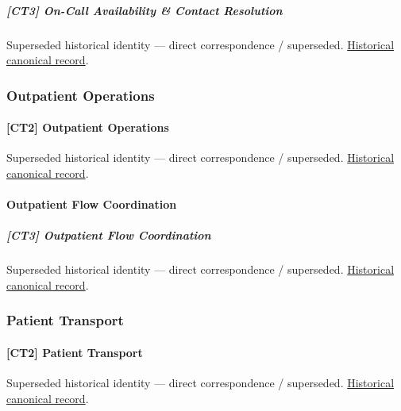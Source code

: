 \subparagraph{[CT3] On-Call Availability \& Contact Resolution}

\par\label{element:a03075a46f75497f8c6ba95d9c9e27c4}
Superseded historical identity — direct correspondence / superseded. \href{../../../../continuum/strategy/capability/a03075a46f75497f8c6ba95d9c9e27c4.md}{Historical canonical record}.\par

\subsubsection{Outpatient Operations}

\paragraph{[CT2] Outpatient Operations}

\par\label{element:3db41bc06ade4f9088eec7b8aedd7448}
Superseded historical identity — direct correspondence / superseded. \href{../../../../continuum/strategy/capability/3db41bc06ade4f9088eec7b8aedd7448.md}{Historical canonical record}.\par

\paragraph{Outpatient Flow Coordination}

\subparagraph{[CT3] Outpatient Flow Coordination}

\par\label{element:e6c59c7b72fe44169a5fdfd08a5e91c4}
Superseded historical identity — direct correspondence / superseded. \href{../../../../continuum/strategy/capability/e6c59c7b72fe44169a5fdfd08a5e91c4.md}{Historical canonical record}.\par

\subsubsection{Patient Transport}

\paragraph{[CT2] Patient Transport}

\par\label{element:e9c1a897884f4d758f5654b824364030}
Superseded historical identity — direct correspondence / superseded. \href{../../../../continuum/strategy/capability/e9c1a897884f4d758f5654b824364030.md}{Historical canonical record}.\par

